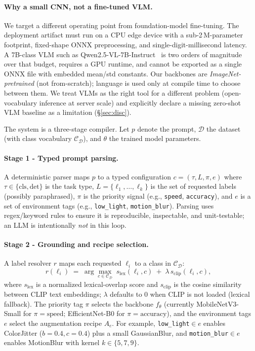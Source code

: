 \documentclass[10pt,twocolumn,letterpaper]{article}
\begin{document}
\paragraph{Why a small CNN, not a fine-tuned VLM.}
We target a different operating point from
foundation-model fine-tuning. The deployment artifact must run on a
CPU edge device with a sub-2\,M-parameter footprint, fixed-shape
ONNX preprocessing, and single-digit-millisecond latency. A 7B-class
VLM such as Qwen2.5-VL-7B-Instruct~\cite{bai2025qwen25vl} is two
orders of magnitude over that budget, requires a GPU runtime, and
cannot be exported as a single ONNX file with embedded mean/std
constants. Our backbones are \emph{ImageNet-pretrained}
(not from-scratch); language is used only at compile time to choose
between them. We treat VLMs as the right tool for a different
problem (open-vocabulary inference at server scale) and explicitly
declare a missing zero-shot VLM baseline as a limitation
(\S\ref{sec:disc}).

The system is a three-stage compiler. Let $p$ denote the prompt,
$\mathcal{D}$ the dataset (with class vocabulary $\mathcal{C}_\mathcal{D}$),
and $\theta$ the trained model parameters.

\paragraph{Stage 1 - Typed prompt parsing.}
A deterministic parser maps $p$ to a typed configuration
$c=(\tau, L, \pi, e)$ where $\tau\in\{\text{cls},\text{det}\}$ is the
task type, $L=\{\ell_1,\ldots,\ell_k\}$ is the set of requested labels
(possibly paraphrased), $\pi$ is the priority signal
(e.g., \texttt{speed}, \texttt{accuracy}), and $e$ is a set of
environment tags (e.g., \texttt{low\_light}, \texttt{motion\_blur}).
Parsing uses regex/keyword rules to ensure it is reproducible,
inspectable, and unit-testable; an LLM is intentionally \emph{not}
in this loop.

\paragraph{Stage 2 - Grounding and recipe selection.}
A label resolver $r$ maps each requested $\ell_i$ to a class in
$\mathcal{C}_\mathcal{D}$:
\[
    r(\ell_i) \;=\; \arg\max_{c\in\mathcal{C}_\mathcal{D}}
    \; s_{\text{lex}}(\ell_i, c)
    \;+\;\lambda\, s_{\text{clip}}(\ell_i, c),
\]
where $s_{\text{lex}}$ is a normalized lexical-overlap score and
$s_{\text{clip}}$ is the cosine similarity between CLIP text
embeddings; $\lambda$ defaults to 0 when CLIP is not loaded
(lexical fallback). The priority tag $\pi$ selects the backbone
$f_\theta$ (currently MobileNetV3-Small for $\pi=\text{speed}$;
EfficientNet-B0 for $\pi=\text{accuracy}$), and the environment tags
$e$ select the augmentation recipe $A_e$. For example,
\texttt{low\_light}$\in e$ enables ColorJitter
($b{=}0.4,c{=}0.4$) plus a small GaussianBlur, and
\texttt{motion\_blur}$\in e$ enables MotionBlur with kernel
$k\in\{5,7,9\}$.
\end{document}
